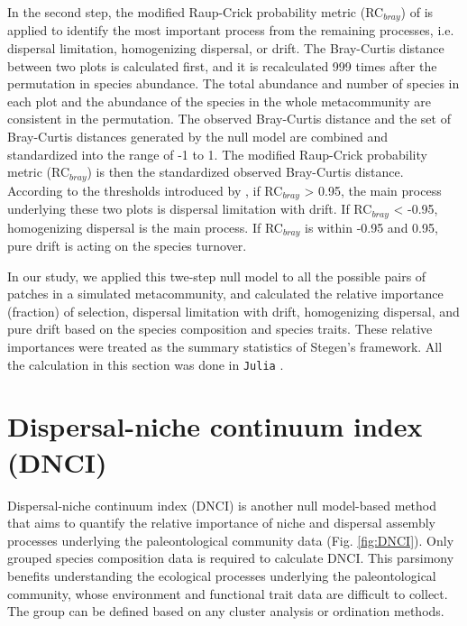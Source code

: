 In the second step, the modified Raup-Crick probability metric (RC$_{bray}$) of \citet{chase2011disentangling} is applied to identify the most important process from the remaining processes, i.e. dispersal limitation, homogenizing dispersal, or drift. The Bray-Curtis distance between two plots is calculated first, and it is recalculated 999 times after the permutation in species abundance. The total abundance and number of species in each plot and the abundance of the species in the whole metacommunity are consistent in the permutation. The observed Bray-Curtis distance and the set of Bray-Curtis distances generated by the null model are combined and standardized into the range of -1 to 1. The modified Raup-Crick probability metric (RC$_{bray}$) is then the standardized observed Bray-Curtis distance. According to the thresholds introduced by \citet{chase2011disentangling}, if RC$_{bray}$ > 0.95, the main process underlying these two plots is dispersal limitation with drift. If RC$_{bray}$ < -0.95, homogenizing dispersal is the main process. If RC$_{bray}$ is within -0.95 and 0.95, pure drift is acting on the species turnover.

In our study, we applied this twe-step null model to all the possible pairs of patches in a simulated metacommunity, and calculated the relative importance (fraction) of selection, dispersal limitation with drift, homogenizing dispersal, and pure drift based on the species composition and species traits. These relative importances were treated as the summary statistics of Stegen's framework. All the calculation in this section was done in \texttt{Julia} \citep{bezanson2017julia}.

\section{Dispersal-niche continuum index (DNCI)}
\noindent
\label{sec:dnci}
Dispersal-niche continuum index (DNCI) is another null model-based method that aims to quantify the relative importance of niche and dispersal assembly processes underlying the paleontological community data \citep{vilmi2021dispersal} (Fig. \ref{fig:DNCI}). Only grouped species composition data is required to calculate DNCI. This parsimony benefits understanding the ecological processes underlying the paleontological community, whose environment and functional trait data are difficult to collect. The group can be defined based on any cluster analysis or ordination methods.


